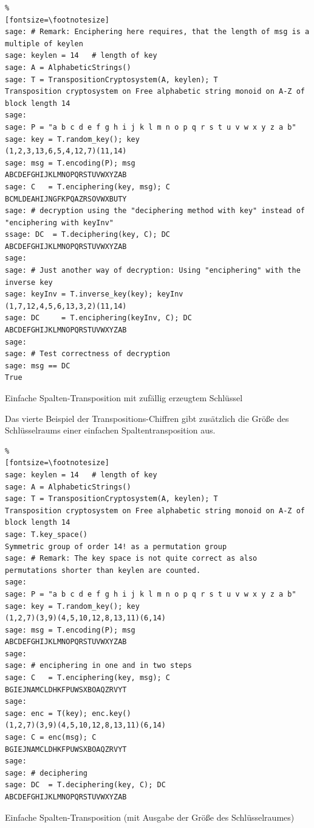 \begin{refsegment}
\begin{sagecode}
\begin{Verbatim}%
[fontsize=\footnotesize]
sage: # Remark: Enciphering here requires, that the length of msg is a multiple of keylen
sage: keylen = 14   # length of key
sage: A = AlphabeticStrings()
sage: T = TranspositionCryptosystem(A, keylen); T
Transposition cryptosystem on Free alphabetic string monoid on A-Z of block length 14
sage:
sage: P = "a b c d e f g h i j k l m n o p q r s t u v w x y z a b"
sage: key = T.random_key(); key
(1,2,3,13,6,5,4,12,7)(11,14)
sage: msg = T.encoding(P); msg
ABCDEFGHIJKLMNOPQRSTUVWXYZAB
sage: C   = T.enciphering(key, msg); C
BCMLDEAHIJNGFKPQAZRSOVWXBUTY
sage: # decryption using the "deciphering method with key" instead of "enciphering with keyInv"
ssage: DC  = T.deciphering(key, C); DC
ABCDEFGHIJKLMNOPQRSTUVWXYZAB
sage:
sage: # Just another way of decryption: Using "enciphering" with the inverse key
sage: keyInv = T.inverse_key(key); keyInv
(1,7,12,4,5,6,13,3,2)(11,14)
sage: DC     = T.enciphering(keyInv, C); DC
ABCDEFGHIJKLMNOPQRSTUVWXYZAB
sage:
sage: # Test correctness of decryption
sage: msg == DC
True
\end{Verbatim}
\caption{Einfache Spalten-Transposition mit zufällig erzeugtem Schlüssel}
\end{sagecode}


\newpage
Das vierte Beispiel der Transpositions-Chiffren gibt zusätzlich die Größe des Schlüsselraums
einer einfachen Spaltentransposition aus.

\begin{sagecode}
\begin{Verbatim}%
[fontsize=\footnotesize]
sage: keylen = 14   # length of key
sage: A = AlphabeticStrings()
sage: T = TranspositionCryptosystem(A, keylen); T
Transposition cryptosystem on Free alphabetic string monoid on A-Z of block length 14
sage: T.key_space()
Symmetric group of order 14! as a permutation group
sage: # Remark: The key space is not quite correct as also permutations shorter than keylen are counted.
sage:
sage: P = "a b c d e f g h i j k l m n o p q r s t u v w x y z a b"
sage: key = T.random_key(); key
(1,2,7)(3,9)(4,5,10,12,8,13,11)(6,14)
sage: msg = T.encoding(P); msg
ABCDEFGHIJKLMNOPQRSTUVWXYZAB
sage:
sage: # enciphering in one and in two steps
sage: C   = T.enciphering(key, msg); C
BGIEJNAMCLDHKFPUWSXBOAQZRVYT
sage:
sage: enc = T(key); enc.key()
(1,2,7)(3,9)(4,5,10,12,8,13,11)(6,14)
sage: C = enc(msg); C
BGIEJNAMCLDHKFPUWSXBOAQZRVYT
sage:
sage: # deciphering
sage: DC  = T.deciphering(key, C); DC
ABCDEFGHIJKLMNOPQRSTUVWXYZAB
\end{Verbatim}
\caption{Einfache Spalten-Transposition (mit Ausgabe der Größe des Schlüsselraumes)}
\end{sagecode}




\end{refsegment}

